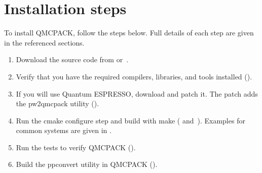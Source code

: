 \documentclass[letterpaper,10pt,english]{sphinxmanual}
\begin{document}
\section{Installation steps}
\label{\detokenize{installation:installation-steps}}
To install QMCPACK, follow the steps below. Full details of each step
are given in the referenced sections.
\begin{enumerate}
%
\item {} 
Download the source code from {\hyperref[\detokenize{installation:obrelease}]{}}
or {\hyperref[\detokenize{installation:obdevelopment}]{}}.

\item {} 
Verify that you have the required compilers, libraries, and tools
installed ({\hyperref[\detokenize{installation:prerequisites}]{}}).

\item {} 
If you will use Quantum ESPRESSO, download and patch it. The patch
adds the pw2qmcpack utility
({\hyperref[\detokenize{installation:buildqe}]{}}).

\item {} 
Run the cmake configure step and build with make
({\hyperref[\detokenize{installation:cmake}]{}} and {\hyperref[\detokenize{installation:cmakequick}]{}}). Examples for
common systems are given in
{\hyperref[\detokenize{installation:installexamples}]{}}.

\item {} 
Run the tests to verify QMCPACK
({\hyperref[\detokenize{installation:testing}]{}}).

\item {} 
Build the ppconvert utility in QMCPACK
({\hyperref[\detokenize{installation:buildppconvert}]{}}).

\end{enumerate}
\end{document}
